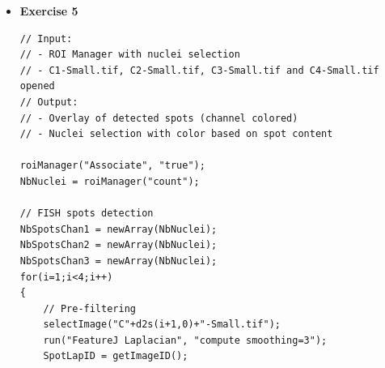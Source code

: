 \documentclass[11pt,a4paper,oneside]{report}
\begin{document}
\begin{itemize}
\begin{lstlisting}
// Input: 
// - ROI Manager with nuclei selection
// - C1-Small.tif, C2-Small.tif, C3-Small.tif and C4-Small.tif opened
// Output: 
// - Spot segmentation masks of the 3 channels
// - 3 Arrays (on per channel) with spot counted in each nucleus

NbNuclei = roiManager("count");

// FISH spots detection
NbSpotsChan1 = newArray(NbNuclei);
NbSpotsChan2 = newArray(NbNuclei);
NbSpotsChan3 = newArray(NbNuclei);
for(i=1;i<4;i++)
{
	// Pre-filtering
	selectImage("C"+d2s(i+1,0)+"-Small.tif");
	run("FeatureJ Laplacian", "compute smoothing=3");
	SpotLapID = getImageID();
	
	// Spot segmentation
	run("Find Maxima...", "noise=4 output=[Single Points] light");
	SpotCandMaskID = getImageID();

	// Cleanup
	selectImage(SpotLapID);
	close();
	
	// Spot count in each nucleus
	selectImage(SpotCandMaskID);
	for(j=0;j<NbNuclei;j++)
	{ 	
		roiManager("select",j);
		getRawStatistics(nPixels, mean, min, max, std, histogram);
		NbSpots = histogram[255];
		if(i==1)NbSpotsChan1[j] = NbSpots;
		if(i==2)NbSpotsChan2[j] = NbSpots;
		if(i==3)NbSpotsChan3[j] = NbSpots;
	}
	
}
run("Select None");

// Display arrays with counted spots per nucleus
print("Array NbSpotsChan1:");
Array.print(NbSpotsChan1);
print("Array NbSpotsChan2:");
Array.print(NbSpotsChan2);
print("Array NbSpotsChan3:");
Array.print(NbSpotsChan3);
\end{lstlisting}
\textbf{sourcecode}: \href{http://www.example.com/contents}{code/solutions/module3\_03.ijm}
\item \textbf{Exercise 5}

\begin{lstlisting}
// Input: 
// - ROI Manager with nuclei selection
// - C1-Small.tif, C2-Small.tif, C3-Small.tif and C4-Small.tif opened
// Output: 
// - Overlay of detected spots (channel colored)
// - Nuclei selection with color based on spot content

roiManager("Associate", "true");
NbNuclei = roiManager("count");

// FISH spots detection
NbSpotsChan1 = newArray(NbNuclei);
NbSpotsChan2 = newArray(NbNuclei);
NbSpotsChan3 = newArray(NbNuclei);
for(i=1;i<4;i++)
{	
	// Pre-filtering
	selectImage("C"+d2s(i+1,0)+"-Small.tif");
	run("FeatureJ Laplacian", "compute smoothing=3");
	SpotLapID = getImageID();
	

\end{lstlisting}
\end{itemize}
\end{document}
